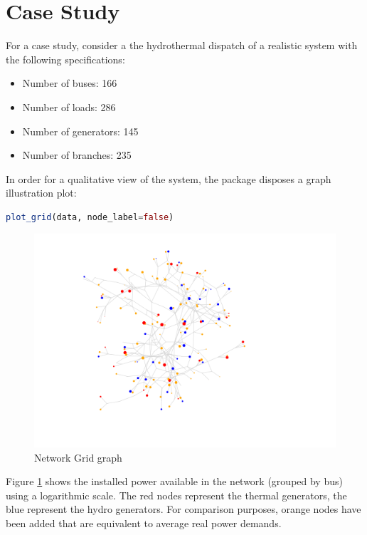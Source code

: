 \documentclass{juliacon}
\begin{document}
\section{Case Study}
\label{sec:case}

For a case study, consider a the hydrothermal dispatch of a realistic system with the following specifications:

\begin{itemize}
    \item Number of buses: 166
    \item Number of loads: 286
    \item Number of generators: 145
    \item Number of branches: 235
\end{itemize}

In order for a qualitative view of the system, the package disposes a graph illustration plot:

\begin{lstlisting}[language = Julia]
plot_grid(data, node_label=false)
\end{lstlisting}

\begin{figure}[htb]
\centerline{\includegraphics[width=1.4\linewidth]{fig/graph_grid.png}}
\caption{Network Grid graph}
\label{fig:graph_grid}
\end{figure}

Figure \ref{fig:graph_grid} shows the installed power available in the network (grouped by bus) using a logarithmic scale. The red nodes represent the thermal generators, the blue represent the hydro generators. For comparison purposes, orange nodes have been added that are equivalent to average real power demands.
\end{document}
